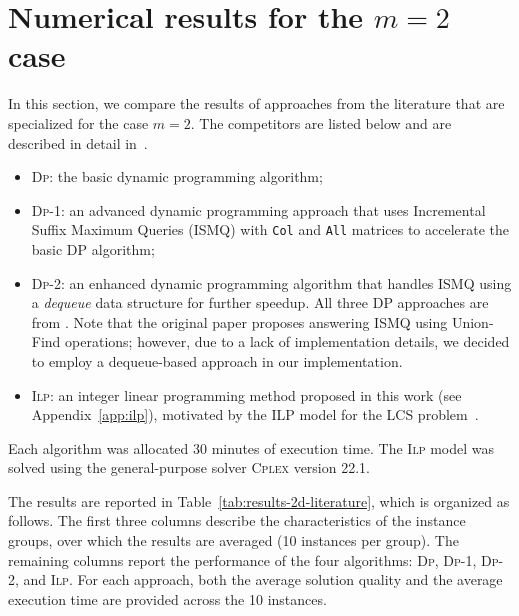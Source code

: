 \documentclass[runningheads]{llncs}
\begin{document}
\section{Numerical results for the $m=2$ case}

  In this section, we compare the results of approaches from the literature that are specialized for the case $m=2$. The competitors are listed below and are described in detail in~\cite{penga2011longest}.

\begin{itemize}
	\item \textsc{Dp}: the basic dynamic programming algorithm;
	\item \textsc{Dp}-1: an advanced dynamic programming approach that uses Incremental Suffix Maximum Queries (ISMQ) with \texttt{Col} and \texttt{All} matrices to accelerate the basic DP algorithm;
	\item \textsc{Dp}-2: an enhanced dynamic programming algorithm that handles ISMQ using a \textit{dequeue} data structure for further speedup. All three DP approaches are from \cite{penga2011longest}. Note that the original paper proposes answering ISMQ using Union-Find operations; however, due to a lack of implementation details, we decided to employ a dequeue-based approach in our implementation.
	\item \textsc{Ilp}: an integer linear programming method proposed in this work (see Appendix~\ref{app:ilp}), motivated by the ILP model for the LCS problem~\cite{blum2016metaheuristics}.
\end{itemize}

Each algorithm was allocated 30 minutes of execution time. The \textsc{Ilp} model was solved using the general-purpose solver \textsc{Cplex} version 22.1.

The results are reported in Table~\ref{tab:results-2d-literature}, which is organized as follows. The first three columns describe the characteristics of the instance groups, over which the results are averaged (10 instances per group). The remaining columns report the performance of the four algorithms: \textsc{Dp}, \textsc{Dp}-1, \textsc{Dp}-2, and \textsc{Ilp}. For each approach, both the average solution quality and the average execution time are provided across the 10 instances.
\end{document}
